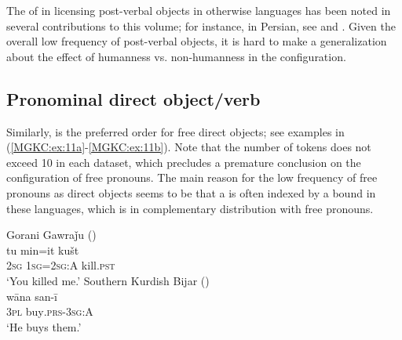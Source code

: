 \documentclass[output=paper,colorlinks,citecolor=brown]{langscibook}
\begin{document}
\begin{sloppypar}

The  of  in licensing post-verbal objects in otherwise  languages has been noted in several contributions to this volume; for instance, in Persian, see  and . Given the overall low frequency of post-verbal objects, it is hard to make a generalization about the effect of humanness vs. non-humanness in the  configuration.

\subsection{Pronominal direct object/verb}
Similarly,  is the preferred order for free  direct objects; see examples in (\ref{MGKC:ex:11a}-\ref{MGKC:ex:11b}). Note that the number of tokens does not exceed 10 in each dataset, which precludes a premature conclusion on the  configuration of free pronouns. The main reason for the low frequency of free pronouns as direct objects seems to be that a  is often indexed by a bound  in these languages, which is in complementary distribution with free pronouns. 

\ea 
\ea\label{MGKC:ex:11a}
Gorani Gawraǰu (\citealt[E, 0920]{mohammadirad_gorani_2022}) \\
\gll tu min=it kušt \\
\textsc{2sg} \textsc{1sg=2sg:A} kill.\textsc{pst}\\
\glt `You killed me.'
\ex\label{MGKC:ex:11b}
Southern Kurdish Bijar (\citealt[D, 0457]{mohammadirad_Bijar_Kurdish_2022}) \\
\gll wāna san-ī \\
 \textsc{3pl} buy\textsc{.prs-3sg:A} \\
\glt `He buys them.' \\
\z
\z 


\end{sloppypar}
\end{document}
